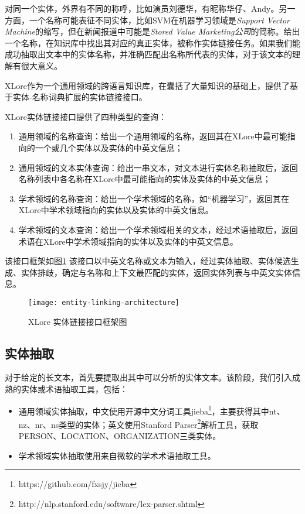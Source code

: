 对同一个实体，外界有不同的称呼，比如演员刘德华，有昵称华仔、Andy。另一方面，一个名称可能表征不同实体，比如SVM在机器学习领域是\textit{Support Vector Machine}的缩写，但在新闻报道中可能是\textit{Stored Value Marketing公司}的简称。给出一个名称，在知识库中找出其对应的真正实体，被称作{\heiti 实体链接}任务。如果我们能成功抽取出文本中的实体名称，并准确匹配出名称所代表的实体，对于该文本的理解有很大意义。

XLore作为一个通用领域的跨语言知识库，在囊括了大量知识的基础上，提供了基于实体-名称词典扩展的实体链接接口。

XLore实体链接接口提供了四种类型的查询：
\begin{enumerate}[1.]
\item 通用领域的名称查询：给出一个通用领域的名称，返回其在XLore中最可能指向的一个或几个实体以及实体的中英文信息；
\item 通用领域的文本实体查询：给出一串文本，对文本进行实体名称抽取后，返回名称列表中各名称在XLore中最可能指向的实体及实体的中英文信息；
\item 学术领域的名称查询：给出一个学术领域的名称，如“机器学习”，返回其在XLore中学术领域指向的实体以及实体的中英文信息。
\item 学术领域的文本查询：给出一个学术领域相关的文本，经过术语抽取后，返回术语在XLore中学术领域指向的实体以及实体的中英文信息。
\end{enumerate}

该接口框架如图\ref{fig:entity-linking-architecture}
该接口以中英文名称或文本为输入，经过实体抽取、实体候选生成、实体排歧，确定与名称和上下文最匹配的实体，返回实体列表与中英文实体信息。
\begin{figure}[H] 
  \centering
  \texttt{[image: entity-linking-architecture]}
  \caption{XLore 实体链接接口框架图}
  \label{fig:entity-linking-architecture}
\end{figure}

\subsection{实体抽取}
对于给定的长文本，首先要提取出其中可以分析的实体文本。该阶段，我们引入成熟的实体或术语抽取工具，包括：
\begin{itemize}
\item 通用领域实体抽取，中文使用开源中文分词工具jieba\footnote{https://github.com/fxsjy/jieba}，主要获得其中nt、nz、nr、ns类型的实体；英文使用Stanford Parser\footnote{http://nlp.stanford.edu/software/lex-parser.shtml}解析工具，获取PERSON、LOCATION、ORGANIZATION三类实体。
\item 学术领域实体抽取使用来自微软的学术术语抽取工具。
\end{itemize}

